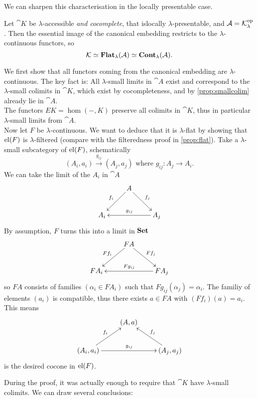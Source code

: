 We can sharpen this characterisation in the locally presentable case.
\begin{Proposition}
Let $\cat K$ be $\lambda$-accessible \emph{and cocomplete}, that islocally $\lambda$-presentable, and $\mathcal{A} = \mathcal{K}^{\textrm{op}}_\lambda$. Then the essential image of the canonical embedding restricts to the $\lambda$-continuous functors, so 
\[ \mathcal{K} \simeq \mathbf{Flat}_\lambda(\mathcal{A}) \simeq \mathbf{Cont}_\lambda(\mathcal{A}). \]
\end{Proposition}
\begin{Proof}
We first show that all functors coming from the canonical embedding are $\lambda$-continuous. The key fact is: All $\lambda$-small limits in $\cat A$ exist and correspond to the $\lambda$-small colimits in $\cat K$, which exist by cocompleteness, and by \ref{prop:smallcolim} already lie in $\cat A$. \\

The functors $EK = \hom(-, K)$ preserve all colimits in $\cat K$, thus in particular $\lambda$-small limits from $\cat A$. \\

Now let $F$ be $\lambda$-continuous. We want to deduce that it is $\lambda$-flat by showing that $\textrm{el}(F)$ is $\lambda$-filtered (compare with the filteredness proof in \ref{prop:flat}). Take a $\lambda$-small subcategory of $\textrm{el}(F)$, schematically
\[ (A_i,a_i) \xrightarrow{g_{ij}} (A_j,a_j) \text{ where } g_{ij} : A_j \to A_i. \]
We can take the limit of the $A_i$ in $\cat A$
\[
\xymatrix{
& A \ar[ld]_{f_i} \ar[rd]^{f_j} & \\
A_i & & A_j \ar[ll]_{g_{ij}}
}\]
By assumption, $F$ turns this into a limit in $\mathbf{Set}$
\[
\xymatrix{
& FA \ar[ld]_{Ff_i} \ar[rd]^{Ff_j} & \\
FA_i & & FA_j \ar[ll]_{Fg_{ij}}
}\]
so $FA$ consists of families $(\alpha_i \in FA_i)$ such that $Fg_{ij}(\alpha_j) = \alpha_i$. The familiy of elements $(a_i)$ is compatible, thus there exists $a \in FA$ with $(Ff_i)(a) = a_i$. This means \[
\xymatrix{
& (A,a) & \\
(A_i,a_i) \ar[ru]^{f_i} \ar[rr]^{g_{ij}} & & (A_j,a_j) \ar[lu]_{f_j}
}\]
is the desired cocone in $\textrm{el}(F)$.
\end{Proof}

During the proof, it was actually enough to require that $\cat K$ have $\lambda$-small colimits. We can draw several conclusions:

